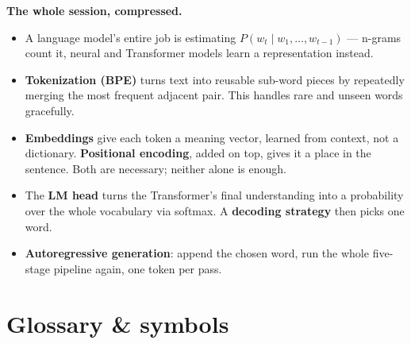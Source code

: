 \documentclass[a4paper,11pt]{article}
\begin{document}
\begin{keytake}
\textbf{The whole session, compressed.}
\begin{itemize}[leftmargin=1.3em,topsep=4pt,itemsep=4pt]
  \item A language model's entire job is estimating
    $P(w_t \mid w_1, \ldots, w_{t-1})$ --- n-grams count it, neural and
    Transformer models learn a representation instead.
  \item \textbf{Tokenization (BPE)} turns text into reusable sub-word
    pieces by repeatedly merging the most frequent adjacent pair. This
    handles rare and unseen words gracefully.
  \item \textbf{Embeddings} give each token a meaning vector, learned from
    context, not a dictionary. \textbf{Positional encoding}, added on top,
    gives it a place in the sentence. Both are necessary; neither alone is
    enough.
  \item The \textbf{LM head} turns the Transformer's final understanding
    into a probability over the whole vocabulary via softmax. A
    \textbf{decoding strategy} then picks one word.
  \item \textbf{Autoregressive generation}: append the chosen word, run the
    whole five-stage pipeline again, one token per pass.
\end{itemize}
\end{keytake}

\section*{Glossary \& symbols}
\end{document}
